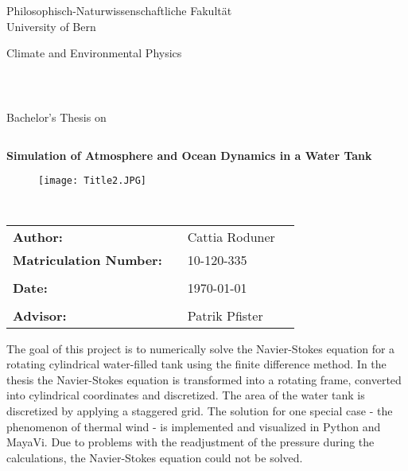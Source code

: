 \documentclass[12pt, a4paper]{article} %
\begin{document}
%

\thispagestyle{empty}
\begin{center}
\Large{Philosophisch-Naturwissenschaftliche Fakultät}\\
\Large{University of Bern}\\
\end{center}


\begin{center}
\Large{Climate and Environmental Physics}
\end{center}
\begin{verbatim}



\end{verbatim}
\begin{center}
\large{Bachelor's Thesis on}
\end{center}
\begin{verbatim}

\end{verbatim}
\begin{center}
\textbf{\Large{Simulation of Atmosphere and Ocean Dynamics in a Water Tank}}\\
\end{center}

\begin{figure}[h]
 \centering
 \texttt{[image: Title2.JPG]}
\end{figure}

\begin{verbatim}


\end{verbatim}

\begin{center}
\begin{tabular}{llll}

\textbf{Author:} & & Cattia Roduner& \\
\textbf{Matriculation Number:} & & 10-120-335& \\
& & &\\
\textbf{Date:} & & \today &\\
& & &\\
\textbf{Advisor:} & & Patrik Pfister &\\

\end{tabular}

\end{center}
\newpage
\thispagestyle{empty}
\mbox{}

\newpage
\abstract
	The goal of this project is to numerically solve the Navier-Stokes equation for a rotating cylindrical water-filled tank using the finite difference method.
	In the thesis the Navier-Stokes equation is transformed into a rotating frame, converted into cylindrical coordinates and discretized. The area of the water tank is discretized by applying a staggered grid.
	The solution for one special case - the phenomenon of thermal wind - is implemented and visualized in Python and MayaVi. Due to problems with the readjustment of the pressure during the calculations, the Navier-Stokes equation could not be solved.
\end{document}
